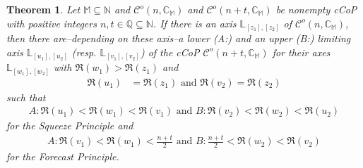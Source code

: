 \documentclass[10pt,a4paper]{amsart}
\newtheorem{theorem}{Theorem}
\newcommand{\C}{\mathcal{C}}
\newcommand{\CC}{\mathbb{C}}
\newcommand{\LL}{\mathbb{L}}
\newcommand{\M}{\mathbb{M}}
\newcommand{\N}{\mathbb{N}}
\begin{document}
\begin{theorem}\label{T-Limits}
Let $\M\subseteq\N$ and $\C^o(n,\CC_{\M})$ and $\C^o(n+t,\CC_{\M})$ be nonempty cCoP with positive integers $n,t\in\mathbb{Q}\subseteq\N$. If there is an axis $\LL_{[z_1],[z_2]}$ of $\C^o(n,\CC_{\M})$, then there are--depending on these axis--a lower (A:) and an upper (B:) limiting axis $\LL_{[u_1],[u_2]}$ (resp.  $\LL_{[v_1],[v_2]}$) of the cCoP $\C^o(n+t,\CC_{\M})$ for their axes $\LL_{[w_1],[w_2]}$ with $\Re(w_1)>\Re(z_1)$ and
\begin{align}
\Re(u_1)&=\Re(z_1) \mbox{ and } \Re(v_2)=\Re(z_2)\label{E-z1u1v2z2}
\end{align}
such that
\begin{align}
A: \Re(u_1)<\Re(w_1)<\Re(v_1)\text{ and }B: \Re(v_2)<\Re(w_2)<\Re(u_2)\label{E-ForSqueeze}
\end{align}
for the Squeeze Principle and
\begin{align}
A: \Re(v_1)<\Re(w_1)<\frac{n+t}{2}\text{ and }B: \frac{n+t}{2}<\Re(w_2)<\Re(v_2)\label{E-ForForecast}
\end{align}
for the Forecast Principle.
\end{theorem}
\end{document}

